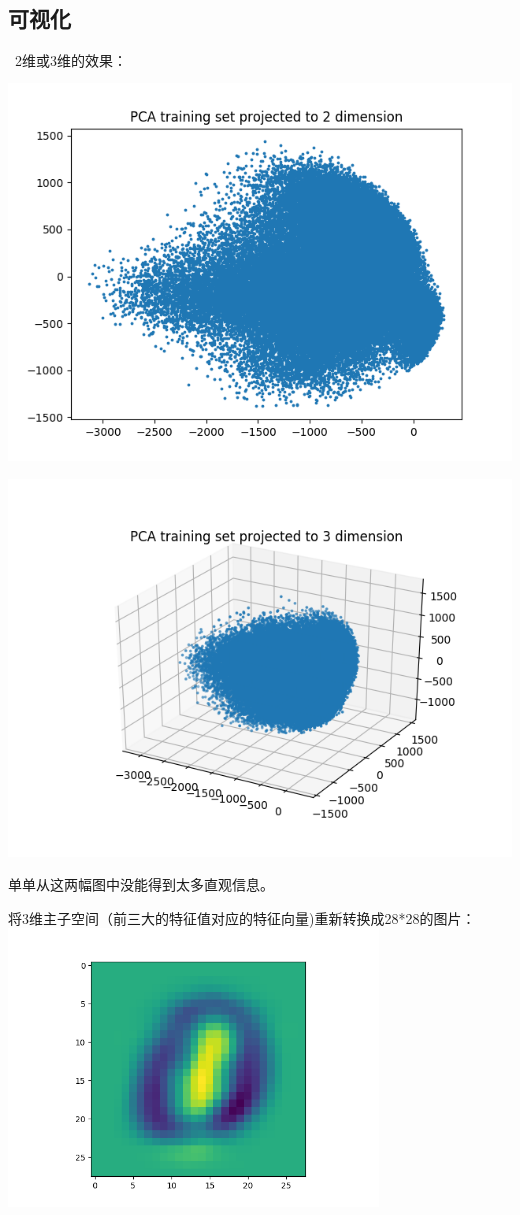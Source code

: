 \documentclass[hyperref,UTF8]{ctexart}
\begin{document}
\subsection*{可视化}\ 
2维或3维的效果：\\
\includegraphics[height=4.2in]{exp-results/pca2.png}\\
\includegraphics{exp-results/pca3.png}\\
\par 单单从这两幅图中没能得到太多直观信息。
\par 将3维主子空间（前三大的特征值对应的特征向量)重新转换成28*28的图片：\\
\includegraphics[height=2.9in]{exp-results/eign0.png}\\
\end{document}

